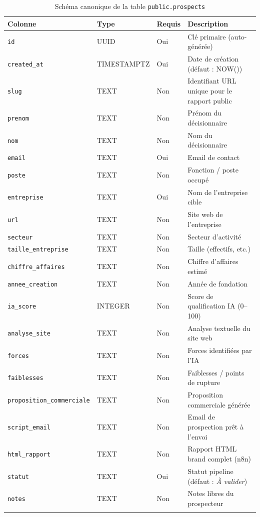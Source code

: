 \documentclass[11pt,a4paper]{report}
\begin{document}
\begin{longtable}{@{}p{3.5cm}p{2cm}p{1.5cm}p{7cm}@{}}
\toprule
\textbf{Colonne} & \textbf{Type} & \textbf{Requis} & \textbf{Description} \\
\midrule
\endhead
\texttt{id} & UUID & Oui & Clé primaire (auto-générée) \\
\texttt{created\_at} & TIMESTAMPTZ & Oui & Date de création (défaut : NOW()) \\
\texttt{slug} & TEXT & Non & Identifiant URL unique pour le rapport public \\
\midrule
\texttt{prenom} & TEXT & Non & Prénom du décisionnaire \\
\texttt{nom} & TEXT & Non & Nom du décisionnaire \\
\texttt{email} & TEXT & Oui & Email de contact \\
\texttt{poste} & TEXT & Non & Fonction / poste occupé \\
\midrule
\texttt{entreprise} & TEXT & Oui & Nom de l'entreprise cible \\
\texttt{url} & TEXT & Non & Site web de l'entreprise \\
\texttt{secteur} & TEXT & Non & Secteur d'activité \\
\texttt{taille\_entreprise} & TEXT & Non & Taille (effectifs, etc.) \\
\texttt{chiffre\_affaires} & TEXT & Non & Chiffre d'affaires estimé \\
\texttt{annee\_creation} & TEXT & Non & Année de fondation \\
\midrule
\texttt{ia\_score} & INTEGER & Non & Score de qualification IA (0--100) \\
\texttt{analyse\_site} & TEXT & Non & Analyse textuelle du site web \\
\texttt{forces} & TEXT & Non & Forces identifiées par l'IA \\
\texttt{faiblesses} & TEXT & Non & Faiblesses / points de rupture \\
\texttt{proposition\_commerciale} & TEXT & Non & Proposition commerciale générée \\
\texttt{script\_email} & TEXT & Non & Email de prospection prêt à l'envoi \\
\texttt{html\_rapport} & TEXT & Non & Rapport HTML brand complet (n8n) \\
\midrule
\texttt{statut} & TEXT & Oui & Statut pipeline (défaut : \emph{À valider}) \\
\texttt{notes} & TEXT & Non & Notes libres du prospecteur \\
\bottomrule
\caption{Schéma canonique de la table \texttt{public.prospects}}
\end{longtable}
\end{document}
